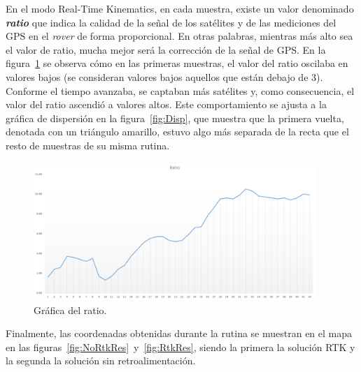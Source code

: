 En el modo Real-Time Kinematics, en cada muestra, existe un valor denominado \textit{\textbf{ratio}} que indica la calidad de la señal de los satélites y de las mediciones del GPS en el \textit{rover} de forma proporcional. En otras palabras, mientras más alto sea el valor de ratio, mucha mejor será la corrección de la señal de GPS. En la figura~\ref{fig:Ratio} se observa cómo en las primeras muestras, el valor del ratio oscilaba en valores bajos (se consideran valores bajos aquellos que están debajo de 3). Conforme el tiempo avanzaba, se captaban más satélites y, como consecuencia, el valor del ratio ascendió a valores altos. Este comportamiento se ajusta a la gráfica de dispersión en la figura~\ref{fig:Disp}, que muestra que la primera vuelta, denotada con un triángulo amarillo, estuvo algo más separada de la recta que el resto de muestras de su misma rutina.

\begin{figure}[H]
\centering
\includegraphics[width=0.95\textwidth]{Figures/Ratio}
\caption[Gráfica del ratio.]{Gráfica del ratio.}
\label{fig:Ratio}
\end{figure}

Finalmente, las coordenadas obtenidas durante la rutina se muestran en el mapa en las figuras~\ref{fig:NoRtkRes}~y~\ref{fig:RtkRes}, siendo la primera la solución RTK y la segunda la solución sin retroalimentación.

